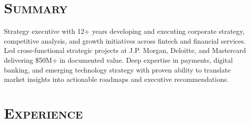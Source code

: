 \documentclass[11pt,a4paper]{moderncv}
\begin{document}
\makecvtitle
\vspace{-40pt}

\section{\textsc{Summary}}
\vspace{-5pt}
Strategy executive with 12+ years developing and executing corporate strategy, competitive analysis, and growth initiatives across fintech and financial services. Led cross-functional strategic projects at J.P. Morgan, Deloitte, and Mastercard delivering \$50M+ in documented value. Deep expertise in payments, digital banking, and emerging technology strategy with proven ability to translate market insights into actionable roadmaps and executive recommendations.

\section{\textsc{Experience}}
\end{document}
